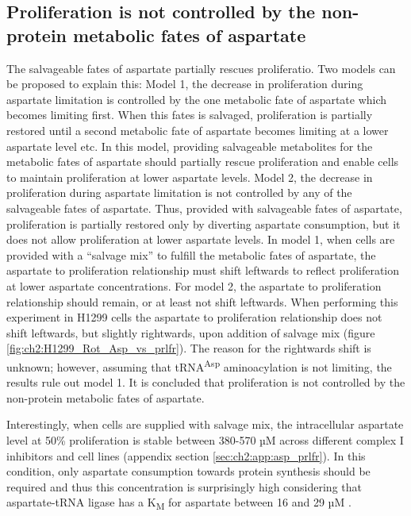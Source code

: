 \subsection{Proliferation is not controlled by the non-protein metabolic fates of aspartate}
The salvageable fates of aspartate partially rescues proliferatio.
Two models can be proposed to explain this:
Model 1, the decrease in proliferation during aspartate limitation is controlled by the one metabolic fate of aspartate which becomes limiting first.
When this fates is salvaged, proliferation is partially restored until a second metabolic fate of aspartate becomes limiting at a lower aspartate level etc.
In this model, providing salvageable metabolites for the metabolic fates of aspartate should partially rescue proliferation and enable cells to maintain proliferation at lower aspartate levels.
Model 2, the decrease in proliferation during aspartate limitation is not controlled by any of the salvageable fates of aspartate.
Thus, provided with salvageable fates of aspartate, proliferation is partially restored only by diverting aspartate consumption, but it does not allow proliferation at lower aspartate levels.
In model 1, when cells are provided with a ``salvage mix'' to fulfill the metabolic fates of aspartate, the aspartate to proliferation relationship must shift leftwards to reflect proliferation at lower aspartate concentrations.
For model 2, the aspartate to proliferation relationship should remain, or at least not shift leftwards.
When performing this experiment in H1299 cells the aspartate to proliferation relationship does not shift leftwards, but slightly rightwards, upon addition of salvage mix (figure \ref{fig:ch2:H1299_Rot_Asp_vs_prlfr}).
The reason for the rightwards shift is unknown; however, assuming that tRNA\textsuperscript{Asp} aminoacylation is not limiting, the results rule out model 1.
It is concluded that proliferation is not controlled by the non-protein metabolic fates of aspartate.

Interestingly, when cells are supplied with salvage mix, the intracellular aspartate level at 50\% proliferation is stable between 380-570 µM across different complex I inhibitors and cell lines (appendix section \ref{sec:ch2:app:asp_prlfr}).
In this condition, only aspartate consumption towards protein synthesis should be required and thus this concentration is surprisingly high considering that aspartate-tRNA ligase has a K\textsubscript{M} for aspartate between 16 and 29 µM \cite{Bour2009-fx, Escalante1993-jy, Messmer2009-xm}.

